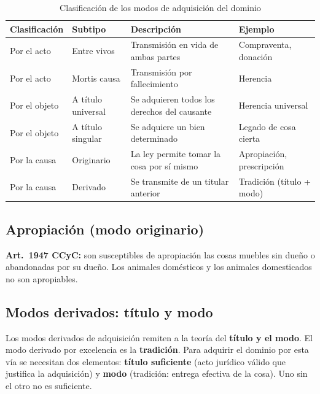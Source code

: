 \documentclass[12pt,oneside]{book}
\begin{document}
\begin{table}[H]
\centering
\caption{Clasificación de los modos de adquisición del dominio}
\small
\begin{tabularx}{\textwidth}{
    >{\raggedright\arraybackslash}p{}
    >{\raggedright\arraybackslash}p{}
    >{\raggedright\arraybackslash}X
    >{\raggedright\arraybackslash}p{}
}
\toprule
\textbf{Clasificación} & \textbf{Subtipo} & \textbf{Descripción} & \textbf{Ejemplo} \\
\midrule
Por el acto & Entre vivos & Transmisión en vida de ambas partes & Compraventa, donación \\
Por el acto & Mortis causa & Transmisión por fallecimiento & Herencia \\
Por el objeto & A título universal & Se adquieren todos los derechos del causante & Herencia universal \\
Por el objeto & A título singular & Se adquiere un bien determinado & Legado de cosa cierta \\
Por la causa & Originario & La ley permite tomar la cosa por sí mismo & Apropiación, prescripción \\
Por la causa & Derivado & Se transmite de un titular anterior & Tradición (título + modo) \\
\bottomrule
\end{tabularx}
\end{table}

\subsection{Apropiación (modo originario)}

\textbf{Art.~1947 CCyC:} son susceptibles de apropiación las cosas muebles sin dueño o abandonadas por su dueño. Los animales domésticos y los animales domesticados no son apropiables.

\subsection{Modos derivados: título y modo}

Los modos derivados de adquisición remiten a la teoría del \textbf{título y el modo}. El modo derivado por excelencia es la \textbf{tradición}. Para adquirir el dominio por esta vía se necesitan dos elementos: \textbf{título suficiente} (acto jurídico válido que justifica la adquisición) y \textbf{modo} (tradición: entrega efectiva de la cosa). Uno sin el otro no es suficiente.
\end{document}
